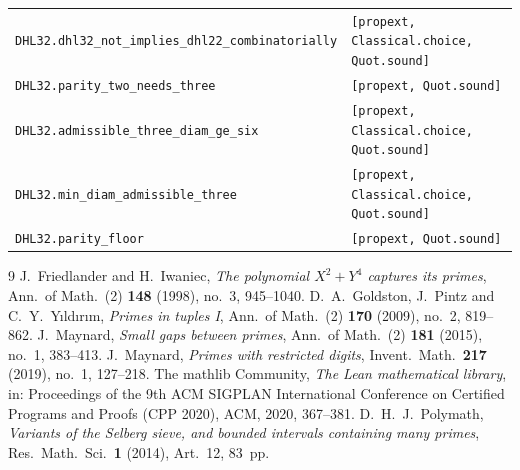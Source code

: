 \documentclass[11pt]{amsart}
\theoremstyle{plain}
\theoremstyle{definition}
\theoremstyle{remark}
\begin{document}
\begin{center}
\begin{tabular}{ll}
\texttt{DHL32.dhl32\_not\_implies\_dhl22\_combinatorially} & \texttt{[propext, Classical.choice, Quot.sound]} \\
\texttt{DHL32.parity\_two\_needs\_three} & \texttt{[propext, Quot.sound]} \\
\texttt{DHL32.admissible\_three\_diam\_ge\_six} & \texttt{[propext, Classical.choice, Quot.sound]} \\
\texttt{DHL32.min\_diam\_admissible\_three} & \texttt{[propext, Classical.choice, Quot.sound]} \\
\texttt{DHL32.parity\_floor} & \texttt{[propext, Quot.sound]} \\
\hline
\end{tabular}
\end{center}

\begin{thebibliography}{9}
 J.~Friedlander and H.~Iwaniec, \emph{The polynomial $X^2+Y^4$ captures its primes}, Ann.\ of Math.\ (2) \textbf{148} (1998), no.~3, 945--1040.
 D.~A.~Goldston, J.~Pintz and C.~Y.~Y{\i}ld{\i}r{\i}m, \emph{Primes in tuples I}, Ann.\ of Math.\ (2) \textbf{170} (2009), no.~2, 819--862.
 J.~Maynard, \emph{Small gaps between primes}, Ann.\ of Math.\ (2) \textbf{181} (2015), no.~1, 383--413.
 J.~Maynard, \emph{Primes with restricted digits}, Invent.\ Math.\ \textbf{217} (2019), no.~1, 127--218.
 The mathlib Community, \emph{The Lean mathematical library}, in: Proceedings of the 9th ACM SIGPLAN International Conference on Certified Programs and Proofs (CPP 2020), ACM, 2020, 367--381.
 D.~H.~J.~Polymath, \emph{Variants of the Selberg sieve, and bounded intervals containing many primes}, Res.\ Math.\ Sci.\ \textbf{1} (2014), Art.~12, 83~pp.
\end{thebibliography}
\end{document}
